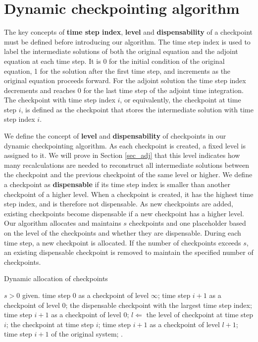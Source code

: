 \documentclass[oneeqnum, onethmnum, onefignum, onetabnum]{siamltex}
\begin{document}
\section{Dynamic checkpointing algorithm} \label{sec_cp}

The key concepts of {\bf time step index}, {\bf level} and {\bf dispensability}
of a checkpoint must be defined before introducing our algorithm.  The time
step index is used to label the intermediate solutions of both the original
equation and the adjoint equation at each time step.  It is 0 for the initial
condition of the original equation, 1 for the solution after the first time
step, and increments as the original equation proceeds forward.  For the
adjoint solution the time step index decrements and reaches 0 for the last
time step of the adjoint time integration.  The checkpoint with time step index
$i$, or equivalently, the checkpoint at time step $i$, is defined as the
checkpoint that stores the intermediate solution with time step index $i$.

We define the concept of {\bf level} and {\bf dispensability} of checkpoints
in our dynamic checkpointing algorithm.  As each checkpoint is created,
a fixed level is assigned to it.  We will prove in Section \ref{sec_adj}
that this level indicates how many recalculations are needed to reconstruct
all intermediate solutions between the checkpoint and the previous checkpoint
of the same level or higher.  We define a checkpoint as {\bf dispensable} if
its time step index is smaller than another checkpoint of a higher level.  When
a checkpoint is created, it has the highest time step index, and is therefore
not dispensable.  As new checkpoints are added, existing checkpoints become
dispensable if a new checkpoint has a higher level.  Our algorithm allocates
and maintains $s$ checkpoints and one placeholder based on the level of
the checkpoints and whether they are dispensable.  During each time step, a new
checkpoint is allocated.  If the number of checkpoints exceeds $s$, an
existing dispensable checkpoint is removed to maintain the specified number of
checkpoints.

\begin{algorithm}
\caption{Dynamic allocation of checkpoints}
\label{alg1}
\begin{algorithmic}[indent=3em]
    \REQUIRE $s > 0$ given.
     time step 0 as a checkpoint of level $\infty$;
             time step $i + 1$ as a checkpoint of level 0;
             the dispensable checkpoint with the largest
                   time step index;
             time step $i + 1$ as a checkpoint of level 0;
        \ELSE
            \STATE $l \Leftarrow$ the level of checkpoint at time step $i$;
             the checkpoint at time step $i$;
             time step $i + 1$ as a checkpoint of level
                   $l + 1$;
        \ENDIF
         time step $i + 1$ of the original system;
    \ENDFOR .
\end{algorithmic}
\end{algorithm}
\end{document}
